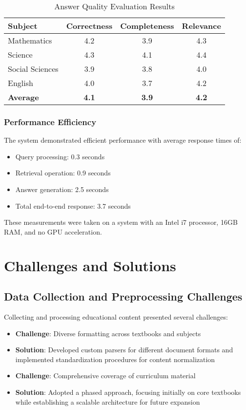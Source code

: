 \documentclass[10pt,conference]{IEEEtran}
\begin{document}
\begin{table}[h]
\centering
\caption{Answer Quality Evaluation Results}
\label{tab:quality}
\begin{tabular}{lccc}
\toprule
\textbf{Subject} & \textbf{Correctness} & \textbf{Completeness} & \textbf{Relevance} \\
\midrule
Mathematics & 4.2 & 3.9 & 4.3 \\
Science & 4.3 & 4.1 & 4.4 \\
Social Sciences & 3.9 & 3.8 & 4.0 \\
English & 4.0 & 3.7 & 4.2 \\
\midrule
\textbf{Average} & \textbf{4.1} & \textbf{3.9} & \textbf{4.2} \\
\bottomrule
\end{tabular}
\end{table}

\subsubsection{Performance Efficiency}
The system demonstrated efficient performance with average response times of:
\begin{itemize}
    \item Query processing: 0.3 seconds
    \item Retrieval operation: 0.9 seconds
    \item Answer generation: 2.5 seconds
    \item Total end-to-end response: 3.7 seconds
\end{itemize}

These measurements were taken on a system with an Intel i7 processor, 16GB RAM, and no GPU acceleration.

\section{Challenges and Solutions}
\subsection{Data Collection and Preprocessing Challenges}
Collecting and processing educational content presented several challenges:
\begin{itemize}
    \item \textbf{Challenge}: Diverse formatting across textbooks and subjects
    \item \textbf{Solution}: Developed custom parsers for different document formats and implemented standardization procedures for content normalization
    
    \item \textbf{Challenge}: Comprehensive coverage of curriculum material
    \item \textbf{Solution}: Adopted a phased approach, focusing initially on core textbooks while establishing a scalable architecture for future expansion
\end{itemize}
\end{document}
